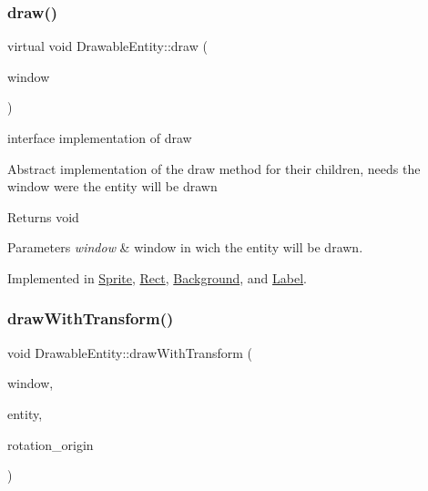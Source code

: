 \subsubsection{\texorpdfstring{draw()}{draw()}}
{\footnotesize\ttfamily virtual void Drawable\+Entity\+::draw (\begin{DoxyParamCaption}\item[{sf\+::\+Render\+Window \&}]{window }\end{DoxyParamCaption})\hspace{0.3cm}{\ttfamily [pure virtual]}}



interface implementation of draw 

Abstract implementation of the draw method for their children, needs the window were the entity will be drawn

\begin{DoxyReturn}{Returns}
void 
\end{DoxyReturn}

\begin{DoxyParams}{Parameters}
{\em window} & window in wich the entity will be drawn. \\
\hline
\end{DoxyParams}


Implemented in \hyperlink{class_sprite_a067dfc27f53ce4d983db29407be1c11e}{Sprite}, \hyperlink{class_rect_a57801edbfb2c000c631a610c59e7ff20}{Rect}, \hyperlink{class_background_a257183f6d077bbee005760813dbb0592}{Background}, and \hyperlink{class_label_aa0e2a948b68c7b70dde12b06b83a0cb1}{Label}.

\mbox{\label{class_drawable_entity_a41ad5dfa5e9a5c366e05ba28bb469557}} 
\subsubsection{\texorpdfstring{draw\+With\+Transform()}{drawWithTransform()}}
{\footnotesize\ttfamily void Drawable\+Entity\+::draw\+With\+Transform (\begin{DoxyParamCaption}\item[{sf\+::\+Render\+Window \&}]{window,  }\item[{const sf\+::\+Drawable \&}]{entity,  }\item[{const sf\+::\+Vector2f \&}]{rotation\+\_\+origin }\end{DoxyParamCaption})}



